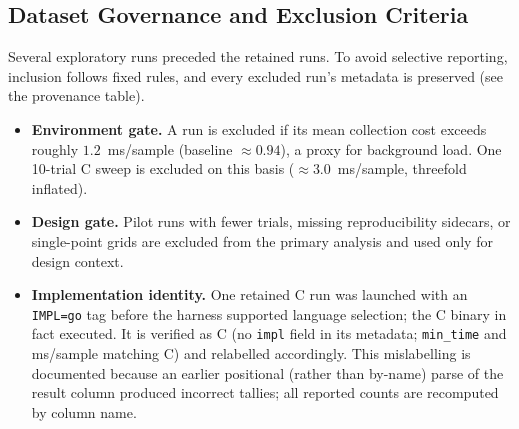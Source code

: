 \subsection{Dataset Governance and Exclusion Criteria}
\label{sec:method-governance}
Several exploratory runs preceded the retained runs. To avoid selective
reporting, inclusion follows fixed rules, and every excluded run's metadata is
preserved (see the provenance table).
\begin{itemize}
  \item \textbf{Environment gate.} A run is excluded if its mean collection cost
        exceeds roughly $1.2$~ms/sample (baseline $\approx 0.94$), a proxy for
        background load. One 10-trial C sweep is excluded on this basis
        ($\approx 3.0$~ms/sample, threefold inflated).
  \item \textbf{Design gate.} Pilot runs with fewer trials, missing
        reproducibility sidecars, or single-point grids are excluded from the
        primary analysis and used only for design context.
  \item \textbf{Implementation identity.} One retained C run was launched with an
        \texttt{IMPL=go} tag before the harness supported language selection;
        the C binary in fact executed. It is verified as C (no \texttt{impl}
        field in its metadata; \texttt{min\_time} and ms/sample matching C) and
        relabelled accordingly. This mislabelling is documented because an
        earlier positional (rather than by-name) parse of the result column
        produced incorrect tallies; all reported counts are recomputed by column
        name.
\end{itemize}
